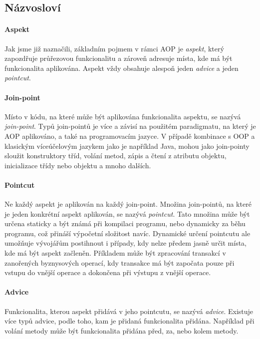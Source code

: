 \subsection{Názvosloví}

\paragraph{Aspekt}
Jak jsme již naznačili, základním pojmem v rámci \gls{AOP} je \textit{aspekt},
který zapozdřuje průřezovou funkcionalitu a zároveň adresuje místa, kde má být
funkcionalita aplikována. Aspekt vždy obsahuje alespoň jeden \textit{advice}
a jeden \textit{pointcut}.

\paragraph{Join-point}
Místo v kódu, na které může být aplikována funkcionalita aspektu, se nazývá
\textit{join-point}. Typů join-pointů je více a závisí na použitém paradigmatu,
na který je \gls{AOP} aplikováno, a také na programovacím jazyce. V případě
kombinace s \gls{OOP} a klasickým víceúčelovým jazykem jako je například Java,
mohou jako join-pointy sloužit konstruktory tříd, volání metod, zápis a čtení
z atributu objektu, inicializace třídy nebo objektu a mnoho dalších.

\paragraph{Pointcut}
Ne každý aspekt je aplikován na každý join-point. Množina join-pointů,
na které je jeden konkrétní aspekt aplikován, se nazývá \textit{pointcut}.
Tato množina může být určena staticky a být známá při kompilaci programu, nebo
dynamicky za běhu programu, což přináší výpočetní složitost navíc.
Dynamické určení pointcutu ale umožňuje vývojářům postihnout i případy,
kdy nelze předem jasně určit místa, kde má být aspekt začleněn.
Příkladem může být zpracování transakcí v zanořených byznysových operací,
kdy transakce má být započata pouze při vstupu do vnější operace
a dokončena při výstupu z vnější operace.

\paragraph{Advice}
Funkcionalita, kterou aspekt přidává v jeho pointcutu, se nazývá
\textit{advice}. Existuje více typů advice, podle toho, kam je
přidaná funkcionalita přidána. Například při volání metody může
být funkcionalita přidána před, za, nebo kolem metody.

